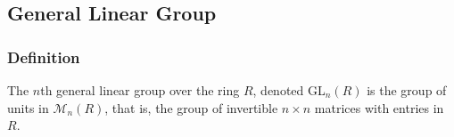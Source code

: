 \subsection{General Linear Group}\label{generallineargroup}

\subsubsection{Definition}
The $n$th general linear group over the ring $R$, denoted GL$_n(R)$ is the group of units in $\mathcal{M}_n(R)$, that is,
the group of invertible $n \times n$ matrices with entries in $R$.